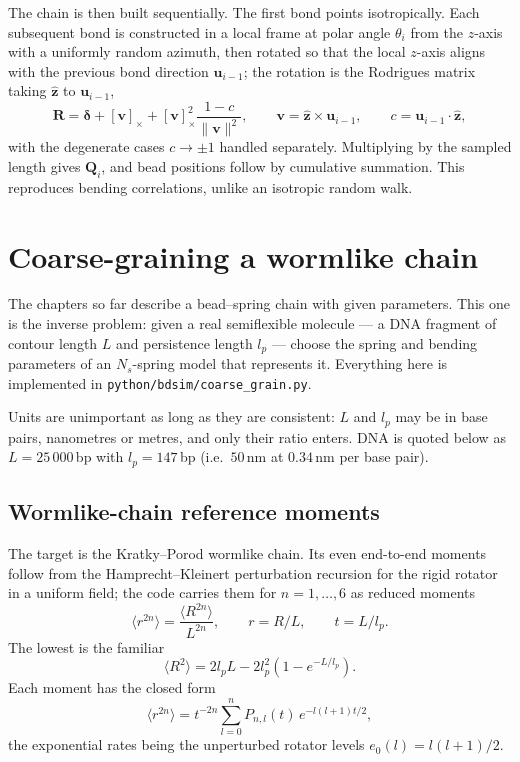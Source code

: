 \documentclass[11pt,a4paper]{report}
\newcommand{\Q}{\bm{Q}}
\newcommand{\uv}{\bm{u}}
\newcommand{\code}[1]{\texttt{\seqsplitcode{#1}}}
\newcommand{\seqsplitcode}[1]{#1}
\begin{document}
The chain is then built sequentially. The first bond points isotropically. Each
subsequent bond is constructed in a local frame at polar angle $\theta_i$ from
the $z$-axis with a uniformly random azimuth, then rotated so that the local
$z$-axis aligns with the previous bond direction $\uv_{i-1}$; the rotation is the
Rodrigues matrix taking $\hat{\bm{z}}$ to $\uv_{i-1}$,
\begin{equation}
  \bm{R} = \bm{\delta} + [\bm{v}]_\times + [\bm{v}]_\times^{2}\frac{1-c}{\|\bm{v}\|^{2}},
  \qquad \bm{v} = \hat{\bm{z}}\times\uv_{i-1},
  \qquad c = \uv_{i-1}\cdot\hat{\bm{z}},
\end{equation}
with the degenerate cases $c\to\pm1$ handled separately. Multiplying by the
sampled length gives $\Q_i$, and bead positions follow by cumulative summation.
This reproduces bending correlations, unlike an isotropic random walk.


\chapter{Coarse-graining a wormlike chain}
\label{ch:coarse}

The chapters so far describe a bead--spring chain with given parameters. This one
is the inverse problem: given a real semiflexible molecule --- a DNA fragment of
contour length $L$ and persistence length $l_p$ --- choose the spring and bending
parameters of an $N_s$-spring model that represents it. Everything here is
implemented in \code{python/bdsim/coarse\_grain.py}.

Units are unimportant as long as they are consistent: $L$ and $l_p$ may be in base
pairs, nanometres or metres, and only their ratio enters. DNA is quoted below as
$L = 25\,000$\,bp with $l_p = 147$\,bp (i.e.\ $50$\,nm at $0.34$\,nm per base pair).

\section{Wormlike-chain reference moments}
\label{sec:wlc-moments}

The target is the Kratky--Porod wormlike chain. Its even end-to-end moments follow
from the Hamprecht--Kleinert perturbation recursion for the rigid rotator in a
uniform field; the code carries them for $n = 1,\dots,6$ as reduced moments
\begin{equation}
  \langle r^{2n}\rangle = \frac{\langle R^{2n}\rangle}{L^{2n}},
  \qquad r = R/L,
  \qquad t = L/l_p .
\end{equation}
The lowest is the familiar
\begin{equation}
  \langle R^{2}\rangle = 2 l_p L - 2 l_p^{2}\left(1 - e^{-L/l_p}\right).
  \label{eq:wlc-r2}
\end{equation}
Each moment has the closed form
\begin{equation}
  \langle r^{2n}\rangle = t^{-2n}\sum_{l=0}^{n} P_{n,l}(t)\,e^{-l(l+1)t/2},
  \label{eq:wlc-closed}
\end{equation}
the exponential rates being the unperturbed rotator levels $e_0(l) = l(l+1)/2$.
\end{document}
